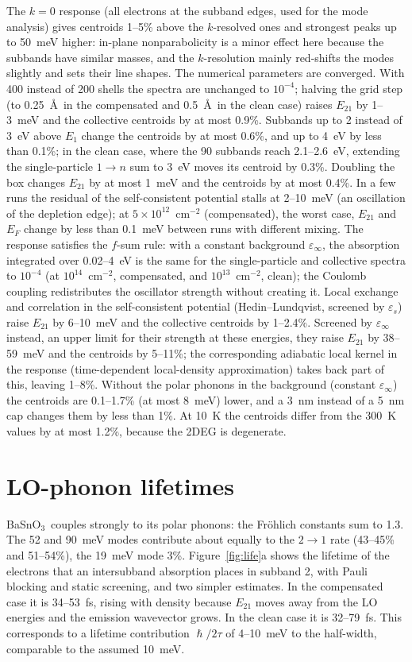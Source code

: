 \documentclass[11pt]{article}
\newcommand{\BSO}{BaSnO$_3$}
\begin{document}
The $k=0$ response (all electrons at the subband edges, used for the mode analysis) gives centroids 1--5\% above the $k$-resolved ones and strongest peaks up to 50~meV higher: in-plane nonparabolicity is a minor effect here because the subbands have similar masses, and the $k$-resolution mainly red-shifts the modes slightly and sets their line shapes. The numerical parameters are converged. With 400 instead of 200 shells the spectra are unchanged to $10^{-4}$; halving the grid step (to 0.25~\AA\ in the compensated and 0.5~\AA\ in the clean case) raises $E_{21}$ by 1--3~meV and the collective centroids by at most 0.9\%. Subbands up to 2 instead of 3~eV above $E_1$ change the centroids by at most 0.6\%, and up to 4~eV by less than 0.1\%; in the clean case, where the 90 subbands reach 2.1--2.6~eV, extending the single-particle $1\to n$ sum to 3~eV moves its centroid by 0.3\%. Doubling the box changes $E_{21}$ by at most 1~meV and the centroids by at most 0.4\%. In a few runs the residual of the self-consistent potential stalls at 2--10~meV (an oscillation of the depletion edge); at $5\times10^{12}$~cm$^{-2}$ (compensated), the worst case, $E_{21}$ and $E_F$ change by less than 0.1~meV between runs with different mixing. The response satisfies the $f$-sum rule: with a constant background $\varepsilon_\infty$, the absorption integrated over 0.02--4~eV is the same for the single-particle and collective spectra to $10^{-4}$ (at $10^{14}$~cm$^{-2}$, compensated, and $10^{13}$~cm$^{-2}$, clean); the Coulomb coupling redistributes the oscillator strength without creating it. Local exchange and correlation in the self-consistent potential (Hedin--Lundqvist, screened by $\varepsilon_s$) raise $E_{21}$ by 6--10~meV and the collective centroids by 1--2.4\%. Screened by $\varepsilon_\infty$ instead, an upper limit for their strength at these energies, they raise $E_{21}$ by 38--59~meV and the centroids by 5--11\%; the corresponding adiabatic local kernel in the response (time-dependent local-density approximation) takes back part of this, leaving 1--8\%. Without the polar phonons in the background (constant $\varepsilon_\infty$) the centroids are 0.1--1.7\% (at most 8~meV) lower, and a 3~nm instead of a 5~nm cap changes them by less than 1\%. At 10~K the centroids differ from the 300~K values by at most 1.2\%, because the 2DEG is degenerate.

\section{LO-phonon lifetimes}\label{sec:tau}
\BSO\ couples strongly to its polar phonons: the Fr\"ohlich constants sum to 1.3. The 52 and 90~meV modes contribute about equally to the $2\to1$ rate (43--45\% and 51--54\%), the 19~meV mode 3\%. Figure~\ref{fig:life}a shows the lifetime of the electrons that an intersubband absorption places in subband 2, with Pauli blocking and static screening, and two simpler estimates. In the compensated case it is 34--53~fs, rising with density because $E_{21}$ moves away from the LO energies and the emission wavevector grows. In the clean case it is 32--79~fs. This corresponds to a lifetime contribution $\hslash/2\tau$ of 4--10~meV to the half-width, comparable to the assumed 10~meV.
\end{document}
